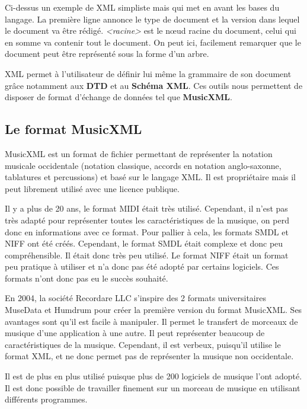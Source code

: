 \par
Ci-dessus un exemple de XML simpliste mais qui met en avant les bases du langage. La première ligne annonce le type de document et la version dans lequel le document va être rédigé. \emph{<racine>} est le nœud racine du document, celui qui en somme va contenir tout le document. On peut ici, facilement remarquer que le document peut être représenté sous la forme d'un arbre.

\par
XML permet à l'utilisateur de définir lui même la grammaire de son document grâce notamment aux \textbf{DTD} et au \textbf{Schéma XML}. Ces outils nous permettent de disposer de format d’échange de données tel que \textbf{MusicXML}.



\subsection{Le format MusicXML}

MusicXML \cite{musicxml} est un format de fichier permettant de représenter la notation musicale occidentale (notation classique, accords en notation anglo-saxonne, tablatures et percussions) et basé sur le langage XML. Il est propriétaire mais il peut librement utilisé avec une licence publique.

\par
Il y a plus de 20 ans, le format MIDI était très utilisé. Cependant, il n’est pas très adapté pour représenter toutes les caractéristiques de la musique, on perd donc en informations avec ce format. Pour pallier à cela, les formats SMDL et NIFF ont été créés. Cependant, le format SMDL était complexe et donc peu compréhensible. Il était donc très peu utilisé. Le format NIFF était un format peu pratique à utiliser et n’a donc pas été adopté par certains logiciels. Ces formats n’ont donc pas eu le succès souhaité.

\par
En 2004, la société Recordare LLC s’inspire des 2 formats universitaires MuseData et Humdrum pour créer la première version du format MusicXML. Ses avantages sont qu’il est facile à manipuler. Il permet le transfert de morceaux de musique d’une application à une autre. Il peut représenter beaucoup de caractéristiques de la musique. Cependant, il est verbeux, puisqu'il utilise le format XML, et ne donc permet pas de représenter la musique non occidentale.

\par
Il est de plus en plus utilisé puisque plus de 200 logiciels de musique l’ont adopté. Il est donc possible de travailler finement sur un morceau de musique en utilisant différents programmes.

